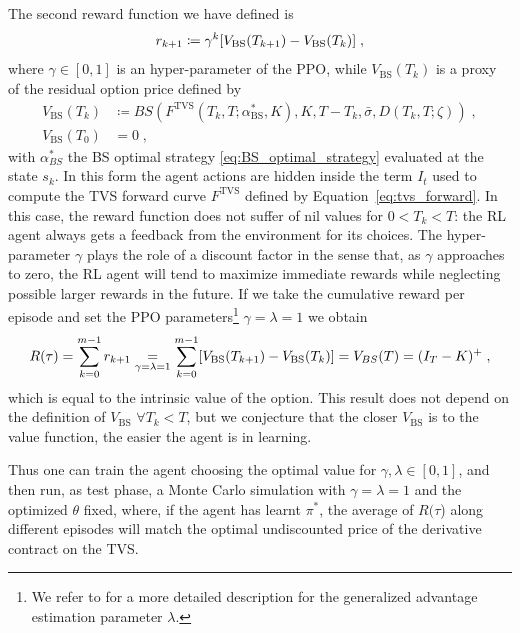 \documentclass[11pt]{article}
\begin{document}
The second reward function we have defined is 
\begin{equation}
 	r_{k+1} \coloneqq  \gamma^{k}[V_{\text{BS}}(T_{k+1})-V_\text{\text{BS}}(T_k)] \; ,
 \label{eq:reward2}\end{equation}
where $\gamma \in[0,1]$ is an hyper-parameter of the PPO, while $V_{\text{BS}}(T_k)$ is a proxy of the residual option price defined by
\begin{equation}
\begin{aligned}
	V_{\text{BS}}(T_k) &\coloneqq BS(F^{\text{TVS}}(T_k,T;\alpha^*_{\text{BS}},K),K,T-T_k,\bar{\sigma},D(T_k,T;\zeta)) \; ,\\
	V_{\text{BS}}(T_0)&=0 \; , 
\end{aligned}
\end{equation} 
with $\alpha^*_{BS}$ the BS optimal strategy \eqref{eq:BS_optimal_strategy} evaluated at the state $s_k$. In this form the agent actions are hidden inside the term $I_t$ used to compute the TVS forward curve $F^{\text{TVS}}$ defined by Equation~\eqref{eq:tvs_forward}. In this case, the reward function does not suffer of nil values for $0<T_k<T$: the RL agent always gets a feedback from the environment for its choices.  The hyper-parameter $\gamma$ plays the role of a discount factor in the sense that, as $\gamma$ approaches to zero, the RL agent will tend to maximize immediate rewards while neglecting possible larger rewards in the future.
If we take the cumulative reward per episode and set the PPO parameters\footnote{We refer to \textcite{Schulman2016} for a more detailed description for the generalized advantage estimation parameter $\lambda$.} $\gamma =\lambda =1$ we obtain
\begin{equation}
	R(\tau) = \sum_{k=0}^{m-1} r_{k+1} \underset{\gamma=\lambda =1}{=} \sum_{k=0}^{m-1}[V_{\text{BS}}(T_{k+1})-V_\text{\text{BS}}(T_k)] = V_{BS}(T) = (I_T-K)^+ \; ,
\end{equation} 
which is equal to the intrinsic value of the option. This result does not depend on the definition of $V_{\text{BS}}$  $\forall T_k<T$, but we conjecture that the closer $V_{\text{BS}}$ is to the value function, the easier the agent is in learning.

Thus one can train the agent choosing the optimal value for $\gamma,\lambda\in[0,1]$, and then run, as test phase, a Monte Carlo simulation with $\gamma=\lambda=1$ and the optimized $\theta$ fixed, where, if the agent has learnt $\pi^*$, the average of $R(\tau$) along different episodes will match the optimal undiscounted price of the derivative contract on the TVS.  
 
\end{document}
